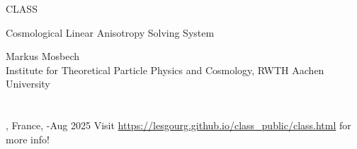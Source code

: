 
\begin{frame}

\begin{block}{
\begin{center}\Large CLASS\end{center}}
\begin{center}\small Cosmological Linear Anisotropy Solving System \end{center}
\end{block}

\scriptsize

\begin{center}
	Markus Mosbech\\
	Institute for Theoretical Particle Physics and Cosmology, RWTH Aachen University\\
	\mbox{}\\
	\mbox{}\\
	\location, France, \ecolefromdate-\ecoletodate Aug 2025
	\vfill
	Visit \url{https://lesgourg.github.io/class_public/class.html} for more info!
\end{center}

\end{frame}
